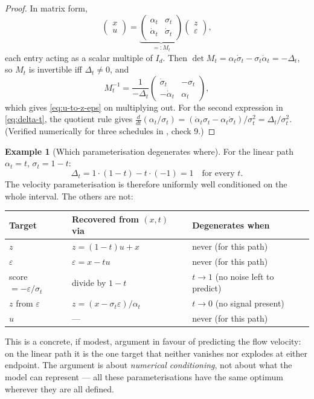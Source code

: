 \documentclass[11pt,a4paper]{report}
\theoremstyle{definition}
\newtheorem{example}[example]{Example}
\theoremstyle{remark}
\begin{document}
\begin{proof}
In matrix form,
\[
\begin{pmatrix}x\\u\end{pmatrix}
=
\underbrace{\begin{pmatrix}\alpha_t&\sigma_t\\\dot\alpha_t&\dot\sigma_t\end{pmatrix}}_{=:M_t}
\begin{pmatrix}z\\\varepsilon\end{pmatrix} ,
\]
each entry acting as a scalar multiple of $I_d$. Then
$\det M_t = \alpha_t\dot\sigma_t-\sigma_t\dot\alpha_t = -\Delta_t$, so
$M_t$ is invertible iff $\Delta_t\ne0$, and
\[
M_t^{-1} = \frac{1}{-\Delta_t}\begin{pmatrix}\dot\sigma_t&-\sigma_t\\-\dot\alpha_t&\alpha_t\end{pmatrix},
\]
which gives \eqref{eq:u-to-z-eps} on multiplying out. For the second
expression in \eqref{eq:delta-t}, the quotient rule gives
$\frac{d}{dt}(\alpha_t/\sigma_t) = (\dot\alpha_t\sigma_t-\alpha_t\dot\sigma_t)/\sigma_t^2 = \Delta_t/\sigma_t^2$.
(Verified numerically for three schedules in ,
check 9.)
\end{proof}

\begin{example}[Which parameterisation degenerates where]
\label{ex:degeneracies}
For the linear path $\alpha_t=t$, $\sigma_t=1-t$:
\[
\Delta_t = 1\cdot(1-t) - t\cdot(-1) = 1
\quad\text{for every }t .
\]
The velocity parameterisation is therefore uniformly well conditioned on
the whole interval. The others are not:

\begin{center}
\begin{tabular}{lll}
\toprule
Target & Recovered from $(x,t)$ via & Degenerates when \\
\midrule
$z$ & $z=(1-t)u+x$ & never (for this path) \\
$\varepsilon$ & $\varepsilon = x-tu$ & never (for this path) \\
score $=-\varepsilon/\sigma_t$ & divide by $1-t$ & $t\to1$ (no noise left to predict) \\
$z$ from $\varepsilon$ & $z=(x-\sigma_t\varepsilon)/\alpha_t$ & $t\to0$ (no signal present) \\
$u$ & --- & never (for this path) \\
\bottomrule
\end{tabular}
\end{center}

This is a concrete, if modest, argument in favour of predicting the flow
velocity: on the linear path it is the one target that neither vanishes nor
explodes at either endpoint. The argument is about \emph{numerical
conditioning}, not about what the model can represent --- all these
parameterisations have the same optimum wherever they are all defined.
\end{example}
\end{document}
